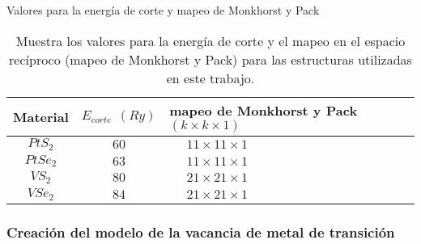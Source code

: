 \begin{frame}{Valores para la energ\'ia de corte y mapeo de Monkhorst y Pack}
	\begin{table}
		\caption[Valores de la energ\'ia de corte y mapeo de Monkhorst-Pack.]{Muestra los valores para la energ\'ia de corte y el mapeo en el espacio rec\'iproco (mapeo de Monkhorst y Pack) para las estructuras utilizadas en este trabajo.}
		\begin{tabular}{|c|c|m{5 cm}|} 
			\hline
			Material       &   $E_{corte}~~(Ry)$     & mapeo de Monkhorst y Pack $(k\times k \times 1)$  \\
			\hline
			\hline
			$PtS_2$        &   $60 $             &  $~~~~~~11 \times 11 \times 1$ \\
			$PtSe_2$        &   $63 $             &  $~~~~~~11 \times 11 \times 1$ \\
			$VS_2$        &   $80 $             &  $~~~~~~21 \times 21 \times 1$ \\
			$VSe_2$        &   $84 $             &  $~~~~~~21 \times 21 \times 1$ \\
			\hline
		\end{tabular}
	\end{table}
\end{frame}
\subsubsection{Creaci\'on del modelo de  la  vacancia de metal de transici\'on}
